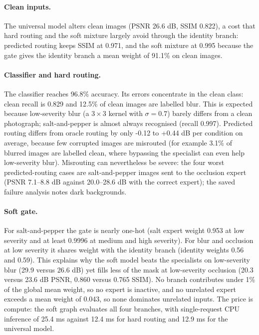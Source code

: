 \documentclass[conference]{IEEEtran}
\begin{document}
\paragraph{Clean inputs.} The universal model alters clean images (PSNR 26.6 dB, SSIM 0.822), a cost that hard routing and the soft mixture largely avoid through the identity branch: predicted routing keeps SSIM at 0.971, and the soft mixture at 0.995 because the gate gives the identity branch a mean weight of 91.1\% on clean images.

\paragraph{Classifier and hard routing.} The classifier reaches 96.8\% accuracy. Its errors concentrate in the clean class: clean recall is 0.829 and 12.5\% of clean images are labelled blur. This is expected because low-severity blur (a $3\times3$ kernel with $\sigma=0.7$) barely differs from a clean photograph; salt-and-pepper is almost always recognised (recall 0.997). 
Predicted routing differs from oracle routing by only -0.12 to +0.44 dB per condition on average, because few corrupted images are misrouted (for example 3.1\% of blurred images are labelled clean, where bypassing the specialist can even help low-severity blur). Misrouting can nevertheless be severe: 
the four worst predicted-routing cases are salt-and-pepper images sent to the occlusion expert (PSNR 7.1--8.8 dB against 20.0--28.6 dB with the correct expert); the saved failure analysis notes dark backgrounds.

\paragraph{Soft gate.} For salt-and-pepper the gate is nearly one-hot (salt expert weight 0.953 at low severity and at least 0.9996 at medium and high severity). For blur and occlusion at low severity it shares weight with the identity branch (identity weights 0.56 and 0.59). This explains why the soft model beats the specialists on low-severity blur (29.9 versus 26.6 dB) yet fills less of the mask at low-severity occlusion (20.3 versus 23.6 dB PSNR, 0.860 versus 0.765 SSIM). No branch contributes under 1\% of the global mean weight, so no expert is inactive, and no unrelated expert exceeds a mean weight of 0.043, so none dominates unrelated inputs. 
The price is compute: the soft graph evaluates all four branches, with single-request CPU inference of 25.4 ms against 12.4 ms for hard routing and 12.9 ms for the universal model.
\end{document}
